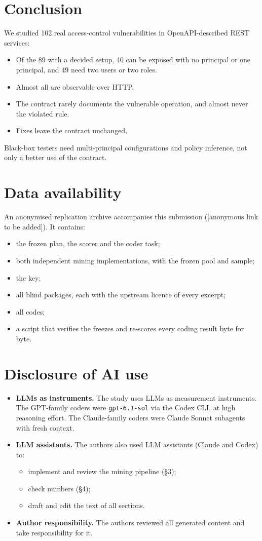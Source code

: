 \documentclass[conference]{IEEEtran}
\begin{document}
\section{Conclusion}
We studied 102 real access-control vulnerabilities in OpenAPI-described REST services:
\begin{itemize}
\item Of the 89 with a decided setup, 40 can be exposed with no principal or one principal, and 49 need two users or two roles.
\item Almost all are observable over HTTP.
\item The contract rarely documents the vulnerable operation, and almost never the violated rule.
\item Fixes leave the contract unchanged.
\end{itemize}

Black-box testers need multi-principal configurations and policy inference, not only a better use of the contract.

\section*{Data availability}
An anonymised replication archive accompanies this submission ([anonymous link to be added]). It contains:
\begin{itemize}
\item the frozen plan, the scorer and the coder task;
\item both independent mining implementations, with the frozen pool and sample;
\item the key;
\item all blind packages, each with the upstream licence of every excerpt;
\item all codes;
\item a script that verifies the freezes and re-scores every coding result byte for byte.
\end{itemize}

\section*{Disclosure of AI use}
\begin{itemize}
\item \textbf{LLMs as instruments.} The study uses LLMs as measurement instruments. The GPT-family coders were \texttt{gpt-6.1-sol} via the Codex CLI, at high reasoning effort. The Claude-family coders were Claude Sonnet subagents with fresh context.
\item \textbf{LLM assistants.} The authors also used LLM assistants (Claude and Codex) to:
\begin{itemize}
\item implement and review the mining pipeline (\S{}3);
\item check numbers (\S{}4);
\item draft and edit the text of all sections.
\end{itemize}
\item \textbf{Author responsibility.} The authors reviewed all generated content and take responsibility for it.
\end{itemize}



\end{document}
